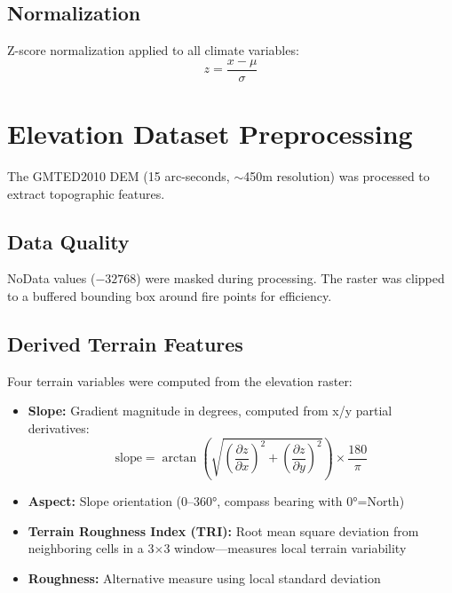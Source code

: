 \subsection{Normalization}
Z-score normalization applied to all climate variables:
\begin{equation}
    z = \frac{x - \mu}{\sigma}
\end{equation}

\section{Elevation Dataset Preprocessing}

The GMTED2010 DEM (15 arc-seconds, $\sim$450m resolution) was processed to extract topographic features.

\subsection{Data Quality}
NoData values ($-32768$) were masked during processing. The raster was clipped to a buffered bounding box around fire points for efficiency.

\subsection{Derived Terrain Features}
Four terrain variables were computed from the elevation raster:

\begin{itemize}
    \item \textbf{Slope:} Gradient magnitude in degrees, computed from x/y partial derivatives:
    \begin{equation}
        \text{slope} = \arctan\left(\sqrt{\left(\frac{\partial z}{\partial x}\right)^2 + \left(\frac{\partial z}{\partial y}\right)^2}\right) \times \frac{180}{\pi}
    \end{equation}
    
    \item \textbf{Aspect:} Slope orientation (0--360°, compass bearing with 0°=North)
    
    \item \textbf{Terrain Roughness Index (TRI):} Root mean square deviation from neighboring cells in a 3$\times$3 window---measures local terrain variability
    
    \item \textbf{Roughness:} Alternative measure using local standard deviation
\end{itemize}


